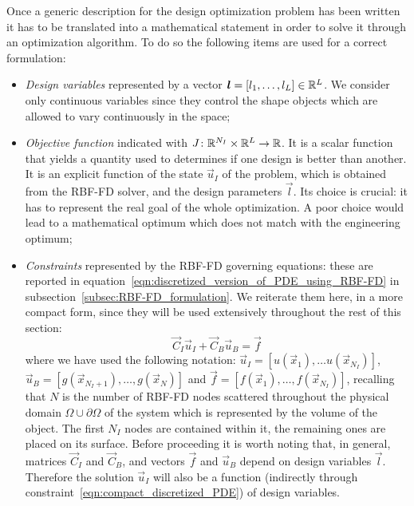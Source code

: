 Once a generic description for the design optimization problem has been written it has to be translated into a mathematical statement in order to solve it through an optimization algorithm. To do so the following items are used for a correct formulation:
\begin{itemize}
	\item \emph{Design variables} represented by a vector $\boldsymbol{l} = \left[ l_1, \dots, l_L \right] \in \mathbb{R}^L$. We consider only continuous variables since they control the shape objects which are allowed to vary continuously in the space;
	
	\item \emph{Objective function} indicated with $J \colon \mathbb{R}^{N_I}\times\mathbb{R}^L \to \mathbb{R}$. It is a scalar function that yields a quantity used to determines if one design is better than another. It is an explicit function of the state $\vec{u}_I$ of the problem, which is obtained from the RBF-FD solver, and the design parameters $\vec{l}$. Its choice is crucial: it has to represent the real goal of the whole optimization. A poor choice would lead to a mathematical optimum which does not match with the engineering optimum;
	\item \emph{Constraints} represented by the RBF-FD governing equations: these are reported in equation~\eqref{eqn:discretized_version_of_PDE_using_RBF-FD} in subsection~\ref{subsec:RBF-FD_formulation}. We reiterate them here, in a more compact form, since they will be used extensively throughout the rest of this section:
	\begin{equation}
		\label{eqn:compact_discretized_PDE}
		\vec{C}_I \vec{u}_I + \vec{C}_B \vec{u}_B = \vec{f}
	\end{equation}
	where we have used the following notation: $\vec{u}_I = \left[ u(\vec{x}_1), \dots u(\vec{x}_{N_I}) \right]$, $\vec{u}_B = \left[ g(\vec{x}_{N_I+1}), \dots, g(\vec{x}_N) \right]$ and $\vec{f} = \left[ f(\vec{x}_1), \dots, f(\vec{x}_{N_I}) \right]$, recalling that $N$ is the number of RBF-FD nodes scattered throughout the physical domain $\Omega\cup\partial\Omega$ of the system which is represented by the volume of the object. The first $N_I$ nodes are contained within it, the remaining ones are placed on its surface.
	Before proceeding it is worth noting that, in general, matrices $\vec{C}_I$ and $\vec{C}_B$, and vectors $\vec{f}$ and $\vec{u}_B$ depend on design variables $\vec{l}$. Therefore the solution $\vec{u}_I$ will also be a function (indirectly through constraint~\eqref{eqn:compact_discretized_PDE}) of design variables.
\end{itemize}
